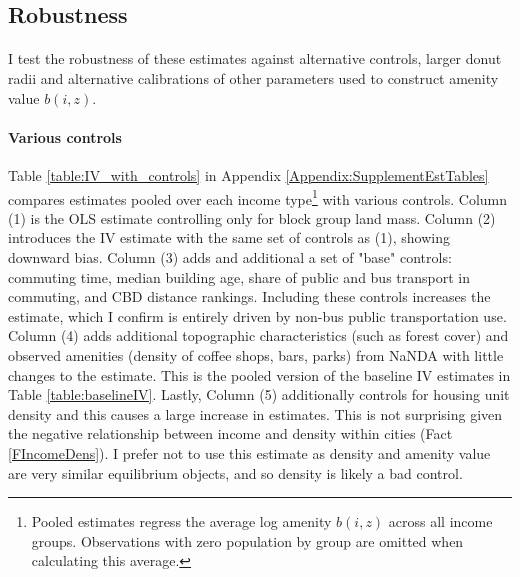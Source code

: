 \documentclass[11pt]{article}
\begin{document}
\subsection{Robustness}
\paragraph*{}
I test the robustness of these estimates against alternative controls, larger donut radii and alternative calibrations of other parameters used to construct amenity value $b(i, z)$.

\paragraph*{Various controls} Table \ref{table:IV_with_controls} in Appendix \ref{Appendix:SupplementEstTables} compares estimates pooled over each income type\footnote{Pooled estimates regress the average log amenity $b(i, z)$ across all income groups. Observations with zero population by group are omitted when calculating this average.} with various controls. Column (1) is the OLS estimate controlling only for block group land mass. Column (2) introduces the IV estimate with the same set of controls as (1), showing downward bias. Column (3) adds and additional a set of "base" controls: commuting time, median building age, share of public and bus transport in commuting, and CBD distance rankings. Including these controls increases the estimate, which I confirm is entirely driven by non-bus public transportation use. Column (4) adds additional topographic characteristics (such as forest cover) and observed amenities (density of coffee shops, bars, parks) from NaNDA with little changes to the estimate. This is the pooled version of the baseline IV estimates in Table \ref{table:baselineIV}.  Lastly, Column (5) additionally controls for housing unit density and this causes a large increase in estimates. This is not surprising given the negative relationship between income and density within cities (Fact \ref{FIncomeDens}). I prefer not to use this estimate as density and amenity value are very similar equilibrium objects, and so density is likely a bad control. 
\end{document}
